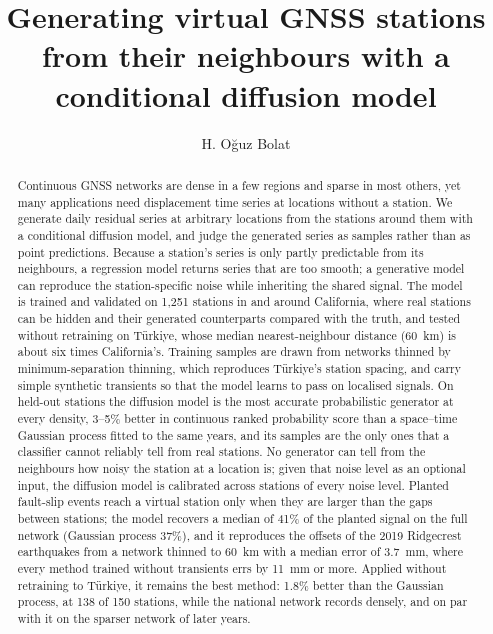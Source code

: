 \documentclass[preprint,12pt,authoryear]{elsarticle}
\begin{document}
\begin{frontmatter}

  \title{Generating virtual GNSS stations from their neighbours with a conditional
  diffusion model}

  \author[ytu]{H. Oğuz Bolat}

  \begin{abstract}
    Continuous GNSS networks are dense in a few regions and sparse in most others, yet
    many applications need displacement time series at locations without a station. We
    generate daily residual series at arbitrary locations from the stations around them
    with a conditional diffusion model, and judge the generated series as samples rather
    than as point predictions. Because a station's series is only partly predictable from
    its neighbours, a regression model returns series that are too smooth; a generative
    model can reproduce the station-specific noise while inheriting the shared signal.
    The model is trained and validated on 1,251 stations in and around California, where
    real stations can be hidden and their generated counterparts compared with the truth,
    and tested without retraining on T\"urkiye, whose median nearest-neighbour distance
    (60~km) is about six times California's. Training samples are drawn from networks
    thinned by minimum-separation thinning, which reproduces T\"urkiye's station spacing,
    and carry simple synthetic transients so that the model learns to pass on localised
    signals. On held-out stations the diffusion model is the most accurate probabilistic
    generator at every density, 3--5\% better in continuous ranked probability score than
    a space--time Gaussian process fitted to the same years, and its samples are the only
    ones that a classifier cannot reliably tell from real stations. No generator can tell
    from the neighbours how noisy the station at a location is; given that noise level as
    an optional input, the diffusion model is calibrated across stations of every noise
    level. Planted fault-slip events reach a virtual station only when they are larger
    than the gaps between stations; the model recovers a median of 41\% of the planted
    signal on the full network (Gaussian process 37\%), and it reproduces the offsets of
    the 2019 Ridgecrest earthquakes from a network thinned to 60~km with a median error
    of 3.7~mm, where every method trained without transients errs by 11~mm or more.
    Applied without retraining to T\"urkiye, it remains the best method: 1.8\% better
    than the Gaussian process, at 138 of 150 stations, while the national network records
    densely, and on par with it on the sparser network of later years.
  \end{abstract}


\end{frontmatter}
\end{document}
